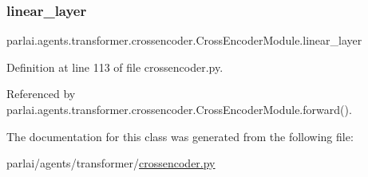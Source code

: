 \subsubsection{\texorpdfstring{linear\+\_\+layer}{linear\_layer}}
{\footnotesize\ttfamily parlai.\+agents.\+transformer.\+crossencoder.\+Cross\+Encoder\+Module.\+linear\+\_\+layer}



Definition at line 113 of file crossencoder.\+py.



Referenced by parlai.\+agents.\+transformer.\+crossencoder.\+Cross\+Encoder\+Module.\+forward().



The documentation for this class was generated from the following file\+:\begin{DoxyCompactItemize}
\item 
parlai/agents/transformer/\hyperlink{crossencoder_8py}{crossencoder.\+py}\end{DoxyCompactItemize}
